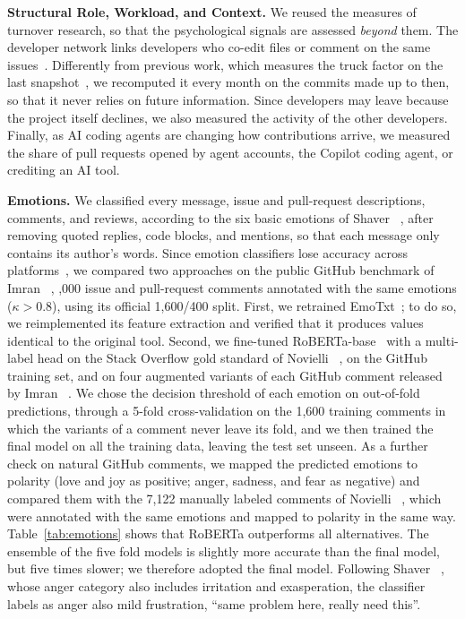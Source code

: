 \textbf{Structural Role, Workload, and Context.} We reused the measures of turnover research, so that the psychological signals are assessed \textit{beyond} them. The developer network links developers who co-edit files or comment on the same issues~\cite{joblin2017classifying}. Differently from previous work, which measures the truck factor on the last snapshot~\cite{avelino2016novel}, we recomputed it every month on the commits made up to then, so that it never relies on future information. Since developers may leave because the project itself declines, we also measured the activity of the other developers. Finally, as AI coding agents are changing how contributions arrive, we measured the share of pull requests opened by agent accounts, \eg the Copilot coding agent, or crediting an AI tool.

\textbf{Emotions.}
\label{subsec:emotions}
We classified every message, \ie issue and pull-request descriptions, comments, and reviews, according to the six basic emotions of Shaver \etal~\cite{shaver1987emotion}, after removing quoted replies, code blocks, and mentions, so that each message only contains its author's words. Since emotion classifiers lose accuracy across platforms~\cite{novielli2020can,imran2022data}, we compared two approaches on the public GitHub benchmark of Imran \etal~\cite{imran2022data}, ,000 issue and pull-request comments annotated with the same emotions ($\kappa > 0.8$), using its official 1,600/400 split. First, we retrained EmoTxt~\cite{calefato2017emotxt}; to do so, we reimplemented its feature extraction and verified that it produces values identical to the original tool. Second, we fine-tuned RoBERTa-base~\cite{liu2019roberta} with a multi-label head on the Stack Overflow gold standard of Novielli \etal~\cite{novielli2018gold}, on the GitHub training set, and on four augmented variants of each GitHub comment released by Imran \etal~\cite{imran2022data}. We chose the decision threshold of each emotion on out-of-fold predictions, \ie through a 5-fold cross-validation on the 1,600 training comments in which the variants of a comment never leave its fold, and we then trained the final model on all the training data, leaving the test set unseen. As a further check on natural GitHub comments, we mapped the predicted emotions to polarity (love and joy as positive; anger, sadness, and fear as negative) and compared them with the 7,122 manually labeled comments of Novielli \etal~\cite{novielli2020can}, which were annotated with the same emotions and mapped to polarity in the same way. Table~\ref{tab:emotions} shows that RoBERTa outperforms all alternatives. The ensemble of the five fold models is slightly more accurate than the final model, but five times slower; we therefore adopted the final model. Following Shaver \etal~\cite{shaver1987emotion}, whose anger category also includes irritation and exasperation, the classifier labels as anger also mild frustration, \eg ``same problem here, really need this''.

